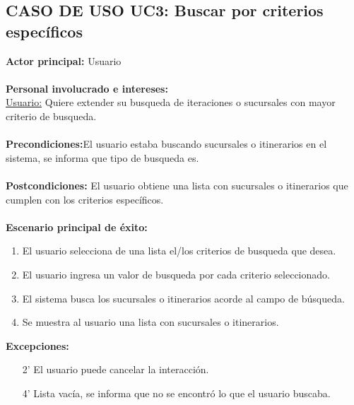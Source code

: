 \documentclass[11pt]{article}
\begin{document}
\subsection*{\textbf{CASO DE USO UC3:} Buscar por criterios específicos }
\textbf{Actor principal:} Usuario\\
\\
\textbf{Personal involucrado e intereses: }\\\underline{Usuario:} Quiere extender su busqueda de iteraciones o sucursales con mayor criterio de busqueda.
\\\\
\textbf{Precondiciones:}El usuario estaba buscando sucursales o itinerarios en el sistema, se informa que tipo de busqueda es.\\ 
\\
\textbf{Postcondiciones:} El usuario obtiene una lista con sucursales o itinerarios que cumplen con los criterios específicos.\\
\\
\textbf{Escenario principal de éxito:}
\begin{enumerate}
\item El usuario selecciona de una lista el/los criterios de busqueda que desea.
\item El usuario ingresa un valor de busqueda por cada criterio seleccionado.
\item El sistema busca los sucursales o itinerarios acorde al campo de búsqueda.
\item Se muestra al usuario una lista con sucursales o itinerarios.
\end{enumerate}
\textbf{Excepciones:}
\begin{enumerate}
\item[2'] El usuario puede cancelar la interacción.
\item[4'] Lista vacía, se informa que no se encontró lo que el usuario buscaba.
\end{enumerate}
\end{document}

